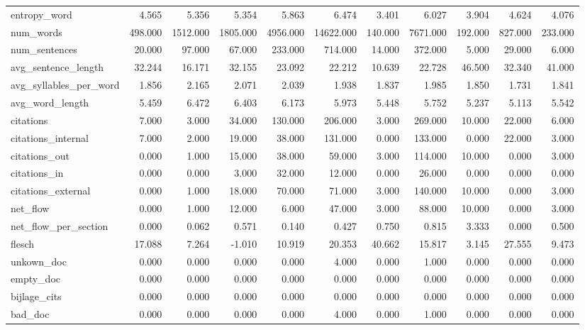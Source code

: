 \begin{tabular}{lrrrrrrrrrr}
\cline{1-11}
entropy\_word & 4.565 & 5.356 & 5.354 & 5.863 & 6.474 & 3.401 & 6.027 & 3.904 & 4.624 & 4.076 \\
\cline{1-11}
num\_words & 498.000 & 1512.000 & 1805.000 & 4956.000 & 14622.000 & 140.000 & 7671.000 & 192.000 & 827.000 & 233.000 \\
\cline{1-11}
num\_sentences & 20.000 & 97.000 & 67.000 & 233.000 & 714.000 & 14.000 & 372.000 & 5.000 & 29.000 & 6.000 \\
\cline{1-11}
avg\_sentence\_length & 32.244 & 16.171 & 32.155 & 23.092 & 22.212 & 10.639 & 22.728 & 46.500 & 32.340 & 41.000 \\
\cline{1-11}
avg\_syllables\_per\_word & 1.856 & 2.165 & 2.071 & 2.039 & 1.938 & 1.837 & 1.985 & 1.850 & 1.731 & 1.841 \\
\cline{1-11}
avg\_word\_length & 5.459 & 6.472 & 6.403 & 6.173 & 5.973 & 5.448 & 5.752 & 5.237 & 5.113 & 5.542 \\
\cline{1-11}
citations & 7.000 & 3.000 & 34.000 & 130.000 & 206.000 & 3.000 & 269.000 & 10.000 & 22.000 & 6.000 \\
\cline{1-11}
citations\_internal & 7.000 & 2.000 & 19.000 & 38.000 & 131.000 & 0.000 & 133.000 & 0.000 & 22.000 & 3.000 \\
\cline{1-11}
citations\_out & 0.000 & 1.000 & 15.000 & 38.000 & 59.000 & 3.000 & 114.000 & 10.000 & 0.000 & 3.000 \\
\cline{1-11}
citations\_in & 0.000 & 0.000 & 3.000 & 32.000 & 12.000 & 0.000 & 26.000 & 0.000 & 0.000 & 0.000 \\
\cline{1-11}
citations\_external & 0.000 & 1.000 & 18.000 & 70.000 & 71.000 & 3.000 & 140.000 & 10.000 & 0.000 & 3.000 \\
\cline{1-11}
net\_flow & 0.000 & 1.000 & 12.000 & 6.000 & 47.000 & 3.000 & 88.000 & 10.000 & 0.000 & 3.000 \\
\cline{1-11}
net\_flow\_per\_section & 0.000 & 0.062 & 0.571 & 0.140 & 0.427 & 0.750 & 0.815 & 3.333 & 0.000 & 0.500 \\
\cline{1-11}
flesch & 17.088 & 7.264 & -1.010 & 10.919 & 20.353 & 40.662 & 15.817 & 3.145 & 27.555 & 9.473 \\
\cline{1-11}
unkown\_doc & 0.000 & 0.000 & 0.000 & 0.000 & 4.000 & 0.000 & 1.000 & 0.000 & 0.000 & 0.000 \\
\cline{1-11}
empty\_doc & 0.000 & 0.000 & 0.000 & 0.000 & 0.000 & 0.000 & 0.000 & 0.000 & 0.000 & 0.000 \\
\cline{1-11}
bijlage\_cits & 0.000 & 0.000 & 0.000 & 0.000 & 0.000 & 0.000 & 0.000 & 0.000 & 0.000 & 0.000 \\
\cline{1-11}
bad\_doc & 0.000 & 0.000 & 0.000 & 0.000 & 4.000 & 0.000 & 1.000 & 0.000 & 0.000 & 0.000 \\
\cline{1-11}
\bottomrule
\end{tabular}
